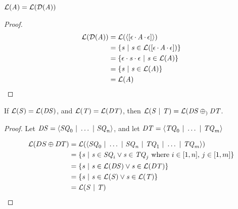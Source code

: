 \documentclass[acmsmall,screen,anonymous]{acmart}
\begin{document}
\begin{mylemma}
  \label{lem:atomtodnfeq}
  $\mathcal{L}(\mathit{A}) = \mathcal{L}(\mathcal{D}(\mathit{A}))$
\end{mylemma}
\begin{proof}
\begin{align*}
  \mathcal{L}(\mathcal{D}(\mathit{A})) &=
  \mathcal{L}(\langle[\epsilon \mkern-1mu\cdot\mkern-1mu \mathit{A} \mkern-1mu\cdot\mkern-1mu \epsilon]\rangle)\\
  & =
  \{\mathit{s} ~|~ \mathit{s} \in
    \mathcal{L}([\epsilon \mkern-1mu\cdot\mkern-1mu \mathit{A} \mkern-1mu\cdot\mkern-1mu \epsilon])\} \\
  & =
  \{\epsilon\cdot\mathit{s}\cdot\epsilon ~|~ \mathit{s} \in
    \mathcal{L}(\mathit{A})\} \\
   & = \{\mathit{s} ~|~ \mathit{s} \in
    \mathcal{L}(\mathit{A})\} \\
    &= \mathcal{L}(\mathit{A})
    \end{align*}
\end{proof}

\begin{mylemma}
  \label{lem:odnfeq}
  If $\mathcal{L}(\mathit{S})=\mathcal{L}(\mathit{DS})$,
  and $\mathcal{L}(\mathit{T})=\mathcal{L}(\mathit{DT})$,
  then $\mathcal{L}(\mathit{S}~|~\mathit{T})=
  \mathcal{L}(\mathit{DS}\oplus_{)}\mathit{DT}$.
\end{mylemma}
\begin{proof}
  Let $\mathit{DS}=\langle\mathit{SQ}_0~|~\ldots~|~\mathit{SQ}_n\rangle$, and
  let $\mathit{DT}=\langle\mathit{TQ}_0~|~\ldots~|~\mathit{TQ}_m\rangle$
  
  \begin{align*}
    \mathcal{L}(DS \oplus DT)& = 
                                                     \mathcal{L}(\langle\mathit{SQ}_0~|~\ldots~|~\mathit{SQ}_n~|~
                                                     \mathit{TQ}_1~|~\ldots~|~\mathit{TQ}_m\rangle)\\
                                                   & = 
                                                     \{\mathit{s}~|~{} \mathit{s}\in\mathit{SQ}_i\vee\mathit{s}\in\mathit{TQ}_j \text{ where $i\in[1,n]$, $j\in[1,m]$}\}\\
                                                   & = 
                                                     \{\mathit{s}{} ~|~{} \mathit{s}\in\mathcal{L}(\mathit{DS})
                                                     \vee{} \mathit{s}\in\mathcal{L}(\mathit{DT})\}\\
                                                   & =
                                                     \{\mathit{s} ~|~{} \mathit{s}\in\mathcal{L}(\mathit{S})
                                                     \vee{} \mathit{s}\in\mathcal{L}(\mathit{T})\}\\
                                                   & =
                                                     \mathcal{L}(\mathit{S}~|~\mathit{T})
  \end{align*}
\end{proof}
\end{document}
